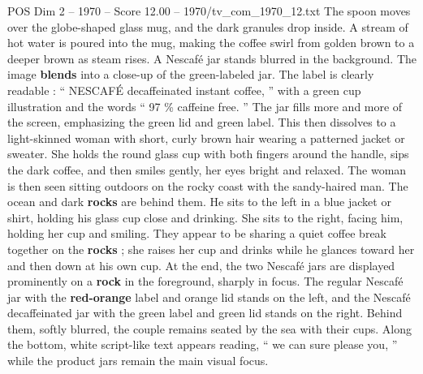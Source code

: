 \begin{textsample}{POS Dim 2 – 1970 – Score 12.00 – 1970/tv\_com\_1970\_12.txt}
The spoon moves over the globe-shaped glass mug, and the dark granules drop inside.
A stream of hot water is poured into the mug, making the coffee swirl from golden brown to a deeper brown as steam rises.
A Nescafé jar stands blurred in the background.
The image \textbf{blends} into a close-up of the green-labeled jar.
The label is clearly readable : “ NESCAFÉ decaffeinated instant coffee, ” with a green cup illustration and the words “ 97 \% caffeine free. ” The jar fills more and more of the screen, emphasizing the green lid and green label.
This then dissolves to a light-skinned woman with short, curly brown hair wearing a patterned jacket or sweater.
She holds the round glass cup with both fingers around the handle, sips the dark coffee, and then smiles gently, her eyes bright and relaxed.
The woman is then seen sitting outdoors on the rocky coast with the sandy-haired man.
The ocean and dark \textbf{rocks} are behind them.
He sits to the left in a blue jacket or shirt, holding his glass cup close and drinking.
She sits to the right, facing him, holding her cup and smiling.
They appear to be sharing a quiet coffee break together on the \textbf{rocks} ; she raises her cup and drinks while he glances toward her and then down at his own cup.
At the end, the two Nescafé jars are displayed prominently on a \textbf{rock} in the foreground, sharply in focus.
The regular Nescafé jar with the \textbf{red-orange} label and orange lid stands on the left, and the Nescafé decaffeinated jar with the green label and green lid stands on the right.
Behind them, softly blurred, the couple remains seated by the sea with their cups.
Along the bottom, white script-like text appears reading, “ we can sure please you, ” while the product jars remain the main visual focus.

\end{textsample}
